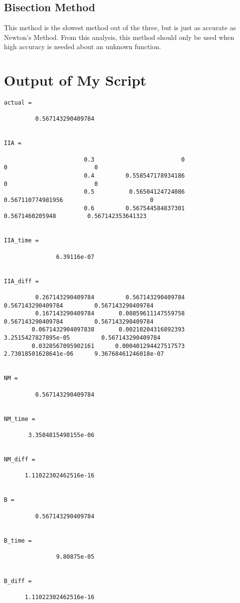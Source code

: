 \documentclass[12pt]{article}
\begin{document}
\subsection{Bisection Method}
This method is the slowest method out of the three, but is just as accurate as Newton's Method.
From this analysis, this method should only be used when high accuracy is needed about an unknown function.

\section{Output of My Script}
{\tiny
\begin{verbatim}
actual =

         0.567143290409784


IIA =

                       0.3                         0                         0                         0
                       0.4         0.558547178934186                         0                         0
                       0.5          0.56504124724086         0.567110774981956                         0
                       0.6         0.567544584837301           0.5671460205948         0.567142353641323


IIA_time =

               6.39116e-07


IIA_diff =

         0.267143290409784         0.567143290409784         0.567143290409784         0.567143290409784
         0.167143290409784       0.00859611147559758         0.567143290409784         0.567143290409784
        0.0671432904097838       0.00210204316892393       3.2515427827895e-05         0.567143290409784
        0.0328567095902161      0.000401294427517573      2.73018501628641e-06      9.36768461246018e-07


NM =

         0.567143290409784


NM_time =

       3.3504815498155e-06


NM_diff =

      1.11022302462516e-16


B =

         0.567143290409784


B_time =

               9.80875e-05


B_diff =

      1.11022302462516e-16
\end{verbatim}
}
\end{document}

